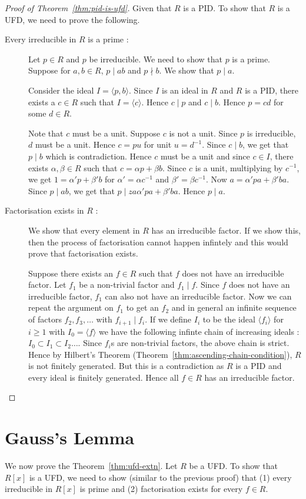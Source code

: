 \begin{proof}[Proof of Theorem~\ref{thm:pid-is-ufd}]
	Given that $R$ is a PID. To show that $R$ is a UFD, we need to prove
	the following.  
	\begin{description}
	\item[Every irreducible in $R$ is a prime : ] 
	Let $p \in R$ and $p$ be irreducible. We need to show that $p$ is a
	prime. Suppose for $a,b \in R$, $p \mid ab$ and $p \nmid b$. We show
	that $p \mid a$. 

	Consider the ideal $I = \langle p, b \rangle$. Since $I$ is an ideal
	in $R$ and $R$ is a PID, there exists a $c \in R$ such that $I =
	\langle c \rangle$. Hence $c \mid p$ and $c \mid b$. Hence $p = cd$ for
	some $d \in R$. 

	Note that $c$ must be a unit. Suppose $c$ is not a unit. Since $p$ is
	irreducible, $d$ must be a unit. Hence $c = pu$ for unit $u = d^{-1}$.
	Since $c \mid b$, we get that $p \mid b$ which is contradiction. Hence
	$c$ must be a unit and since $c \in I$, there exists $\alpha, \beta
	\in R$ such that $c = \alpha p + \beta b$. Since $c$ is a unit,
	multiplying by $c^{-1}$, we get $1 =  \alpha'p+\beta' b$ for 
	$\alpha' = \alpha c^{-1}$ and $\beta' = \beta c^{-1}$. Now $a = \alpha'
	pa + \beta' ba$. Since $p \mid ab$, we get that $p  \mid
za	\alpha' pa+\beta' ba$. Hence $p \mid a$.
	\item [Factorisation exists in $R$ : ] We show that every element in $R$
	has an irreducible factor. If we show this, then the process of
	factorisation cannot happen infintely and this would prove that
	factorisation exists.
		
	Suppose there exists an $f \in R$ such that $f$ does not have an
	irreducible factor. Let $f_1$ be a non-trivial factor and $f_1 \mid
	f$. Since $f$ does not have an irreducible factor, $f_1$ can also not
	have an irreducible factor. Now we can repeat the argument on $f_1$ to
	get an $f_2$ and in general an infinite sequence of factors
	$f_2,f_3,\ldots$ with $f_{i+1} \mid f_i$. If we define $I_i$ to be the
	ideal $\langle f_i \rangle $ for $i \ge 1$ with $I_0 = \langle f
	\rangle$ we have the following infinte chain of increasing ideals :
	$I_0 \subset I_1 \subset I_2 \ldots$. Since $f_i$s are non-trivial
	factors, the above chain is strict. Hence by Hilbert's Theorem
	(Theorem~\ref{thm:ascending-chain-condition}), $R$ is not finitely
	generated. But this is a contradiction as $R$ is a PID and every ideal
	is finitely generated. Hence all $f \in R$ has an irreducible factor.
\end{description}
\end{proof}

\section{Gauss's Lemma}
We now prove the Theorem~\ref{thm:ufd-extn}. Let $R$ be a UFD. 
To show that $R[x]$ is a UFD, we need to show (similar to the previous proof)
that (1) every irreducible in $R[x]$ is prime and (2) factorisation exists for
every $f \in R$.


